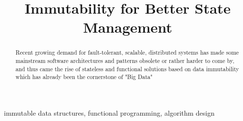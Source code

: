 \documentclass[conference]{IEEEtran}
\begin{document}
\title{Immutability for Better State Management}

\author{
\and
{}
}

\maketitle



\begin{abstract}
    Recent growing demand for fault-tolerant, scalable, distributed systems has made some mainstream software architectures and patterns obsolete or rather harder to come by, and thus came the rise of stateless and functional solutions based on data immutability which has already been the cornerstone of "Big Data"

\end{abstract}

\begin{IEEEkeywords}
immutable data structures, functional programming, algorithm design
\end{IEEEkeywords}
\end{document}
